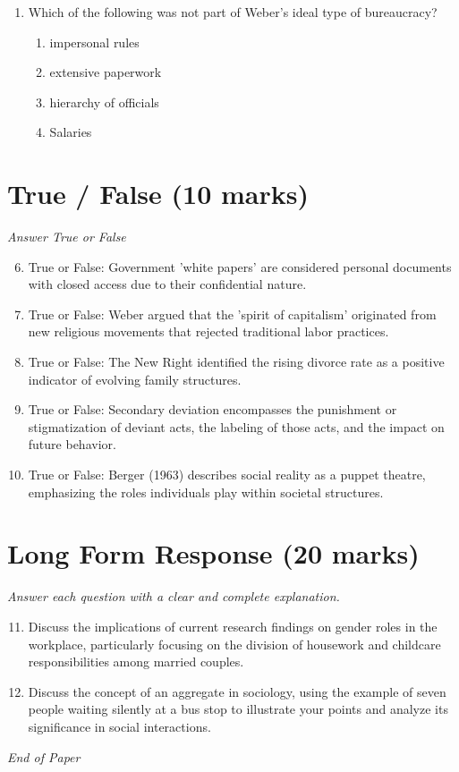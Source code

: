 \documentclass[12pt]{article}
\begin{document}
\begin{enumerate}[label=\arabic*.]
\begin{enumerate}[label=(\alph*)]
    \item transnational corporations
    \item multi-media empires
    \item ownership concentrated within one medium
    \item government-owned companies
\end{enumerate}
\item Which of the following was not part of Weber's ideal type of bureaucracy?
\begin{enumerate}[label=(\alph*)]
    \item impersonal rules
    \item extensive paperwork
    \item hierarchy of officials
    \item Salaries
\end{enumerate}
\end{enumerate}

\section*{True / False (10 marks)}
\textit{Answer True or False}
\begin{enumerate}[label=\arabic*.]
\setcounter{enumi}{5}
\item True or False: Government 'white papers' are considered personal documents with closed access due to their confidential nature.
\item True or False: Weber argued that the 'spirit of capitalism' originated from new religious movements that rejected traditional labor practices.
\item True or False: The New Right identified the rising divorce rate as a positive indicator of evolving family structures.
\item True or False: Secondary deviation encompasses the punishment or stigmatization of deviant acts, the labeling of those acts, and the impact on future behavior.
\item True or False: Berger (1963) describes social reality as a puppet theatre, emphasizing the roles individuals play within societal structures.
\end{enumerate}

\section*{Long Form Response (20 marks)}
\textit{Answer each question with a clear and complete explanation.}
\begin{enumerate}[label=\arabic*.]
\setcounter{enumi}{10}
\item Discuss the implications of current research findings on gender roles in the workplace, particularly focusing on the division of housework and childcare responsibilities among married couples.
\item Discuss the concept of an aggregate in sociology, using the example of seven people waiting silently at a bus stop to illustrate your points and analyze its significance in social interactions.
\end{enumerate}

\vfill
\noindent\textit{End of Paper}
\end{document}
